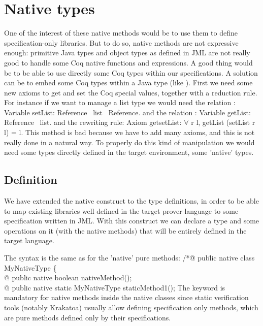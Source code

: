 \section{Native types}
One of the interest of these native methods would be to use them to define  
specification-only libraries. But to do so, native methods are not expressive 
enough: primitive Java types and object types as defined in JML are not 
really good to handle some Coq native functions and expressions.
A good thing would be to be able to use directly some Coq types within our 
specifications.
A solution can be to embed some Coq types within a Java type 
(like ).
First we need some new axioms to get and set the Coq special values, together with a reduction rule. 
For instance if we want to manage a list type
we would need the relation :
\btab
Variable setList: Reference \rarrow \ list \rarrow \ Reference.
\etab
and the relation :
\btab
Variable getList:  Reference \rarrow \ list.
\etab
and the rewriting rule:
\btab
Axiom getsetList: $\forall$ r l, getList (setList r l) = l.
\etab 
This method is bad because we have to add many axioms, and this is not really 
done in a natural way.
To properly do this kind of manipulation we would need some types directly defined 
in the target environment,  some 'native' types.

\subsection{Definition}
We have extended the native construct to the type definitions, in order to be able to map
existing libraries well defined in the target prover language to some specification written in
JML. With this construct we can declare a type and some operations on it (with the native methods)
that will be entirely defined in the target language.

The syntax is the same as for the 'native' pure methods:
\btab
/*\=@ pub\=lic native class MyNativeType \{\+\\
   @ \> public native boolean nativeMethod();\\
   @ \> public native static MyNativeType staticMethod1();
\etab
The  keyword is mandatory for native methods inside the native classes 
since static verification tools (notably Krakatoa) usually allow defining specification only 
methods, which are pure methods defined only by their specifications.

